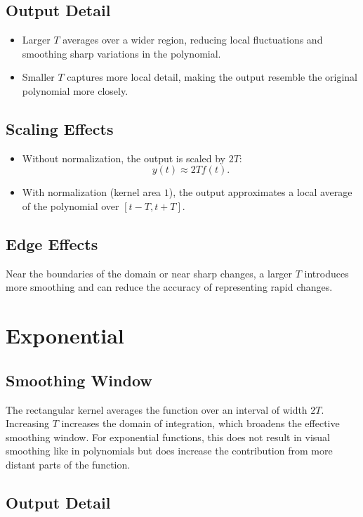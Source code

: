 \documentclass[12pt,a4paper]{report}
\begin{document}
    \subsection{Output Detail}
    \begin{itemize}
        \item Larger $T$ averages over a wider region, reducing local fluctuations and smoothing sharp variations in the polynomial.
        \item Smaller $T$ captures more local detail, making the output resemble the original polynomial more closely.
    \end{itemize}

    \subsection{Scaling Effects}
    \begin{itemize}
        \item Without normalization, the output is scaled by $2T$: 
        \[
        y(t) \approx 2T f(t).
        \]
        \item With normalization (kernel area $1$), the output approximates a local average of the polynomial over $[t - T, t + T]$.
    \end{itemize}

    \subsection{Edge Effects}Near the boundaries of the domain or near sharp changes, a larger $T$ introduces more smoothing and can reduce the accuracy of representing rapid changes.
\section{Exponential}
\subsection{Smoothing Window}

The rectangular kernel averages the function over an interval of width \( 2T \). Increasing \( T \) increases the domain of integration, which broadens the effective smoothing window. For exponential functions, this does not result in visual smoothing like in polynomials but does increase the contribution from more distant parts of the function.

\subsection{ Output Detail}
\end{document}
